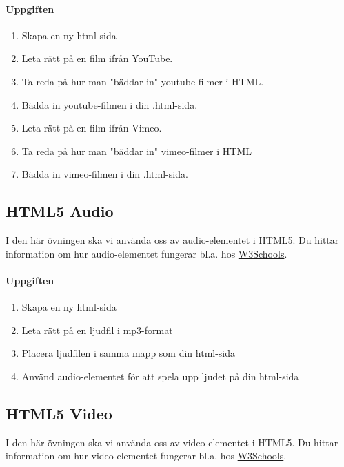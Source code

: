 \documentclass{article}
\begin{document}
    \paragraph*{Uppgiften}
      \begin{enumerate}
        \item Skapa en ny html-sida
        \item Leta rätt på en film ifrån YouTube.
        \item Ta reda på hur man "bäddar in" youtube-filmer i HTML.
        \item Bädda in youtube-filmen i din .html-sida.
        \item Leta rätt på en film ifrån Vimeo.
        \item Ta reda på hur man "bäddar in" vimeo-filmer i HTML
        \item Bädda in vimeo-filmen i din .html-sida.
      \end{enumerate}




  \subsection{ HTML5 Audio }
    I den här övningen ska vi använda oss av audio-elementet i HTML5. Du hittar information om hur audio-elementet fungerar bl.a. hos \href{http://www.w3schools.com/html/html5_audio.asp}{W3Schools}.

    \paragraph{Uppgiften}
      \begin{enumerate}
        \item Skapa en ny html-sida
        \item Leta rätt på en ljudfil i mp3-format
        \item Placera ljudfilen i samma mapp som din html-sida
        \item Använd audio-elementet för att spela upp ljudet på din html-sida
      \end{enumerate}




  \subsection{ HTML5 Video }
    I den här övningen ska vi använda oss av video-elementet i HTML5. Du hittar information om hur video-elementet fungerar bl.a. hos \href{http://www.w3schools.com/html/html5_video.asp}{W3Schools}.
\end{document}
